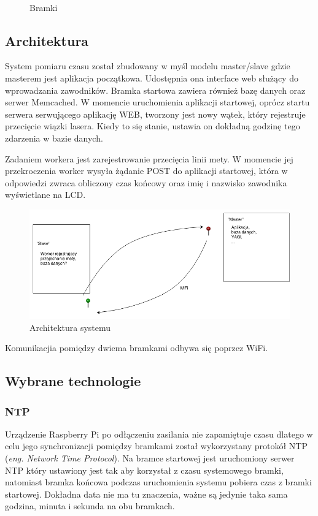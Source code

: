 \documentclass[11pt,a4paper, twoside]{article}
\begin{document}
\begin{figure}[H]
\begin{center}
\caption{Bramki}
$\label{both}$
\end{center}
\end{figure}

\newpage
\subsection{Architektura}
System pomiaru czasu został zbudowany w myśl modelu master/slave gdzie masterem jest aplikacja początkowa. Udostępnia ona interface web służący do wprowadzania zawodników. Bramka startowa zawiera również bazę danych oraz serwer Memcached. W momencie uruchomienia aplikacji startowej, oprócz startu serwera serwującego aplikację WEB, tworzony jest nowy wątek, który rejestruje przecięcie wiązki lasera. Kiedy to się stanie, ustawia on dokładną godzinę tego zdarzenia w bazie danych.

Zadaniem workera jest zarejestrowanie przecięcia linii mety. W momencie jej przekroczenia worker wysyła żądanie POST do aplikacji startowej, która w odpowiedzi zwraca obliczony czas końcowy oraz imię i nazwisko zawodnika wyświetlane na LCD.
\newline

\begin{figure}[ht]
\includegraphics[scale=0.5]{./img/asdasd.png}
\caption{Architektura systemu}
\end{figure}
\noindent
Komunikacjia pomiędzy dwiema bramkami odbywa się poprzez WiFi.
\subsection{Wybrane technologie}
\subsubsection{NTP}
Urządzenie Raspberry Pi po odłączeniu zasilania nie zapamiętuje czasu dlatego w celu jego synchronizacji pomiędzy bramkami został wykorzystany protokół NTP (\emph{eng. Network Time Protocol}). Na bramce startowej jest uruchomiony serwer NTP który ustawiony jest tak aby korzystał z czasu systemowego bramki, natomiast bramka końcowa podczas uruchomienia systemu pobiera czas z bramki startowej. Dokładna data nie ma tu znaczenia, ważne są jedynie taka sama godzina, minuta i sekunda na obu bramkach.
\end{document}
